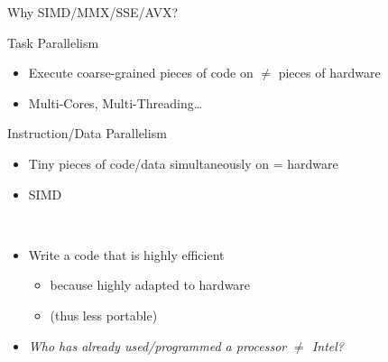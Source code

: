 \documentclass[presentation]{beamer}
\begin{document}
\begin{frame}[label={sec:org2c4cc7f}]{Why SIMD/MMX/SSE/AVX?}
\begin{block}{Task Parallelism}
\begin{itemize}
\item Execute coarse-grained pieces of code on \(\neq\) pieces of hardware
\item Multi-Cores, \alert{Multi-Threading}\ldots{}
\end{itemize}
\pause
\end{block}
\begin{block}{Instruction/Data Parallelism}
\begin{itemize}
\item Tiny pieces of code/data simultaneously on = hardware
\item \alert{SIMD}
\end{itemize}
\pause
\end{block}

\begin{block}{ ~~}
\medskip
\begin{itemize}
\item Write a code that is \alert{highly efficient}
\begin{itemize}
\item because \alert{highly adapted to hardware}
\item (thus less portable)
\end{itemize}
\end{itemize}
\medskip \pause
\begin{itemize}
\item \emph{Who has already used/programmed a processor \(\neq\) Intel?}
\end{itemize}
\bigskip
\end{block}
\end{frame}
\end{document}
